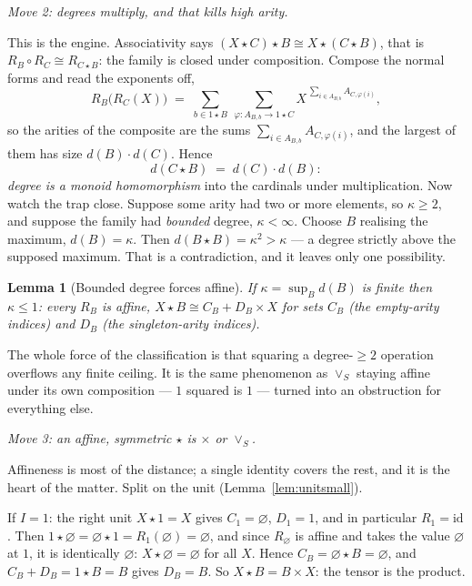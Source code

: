 \documentclass[11pt,a4paper]{book}
\newcommand{\id}{\mathrm{id}}
\theoremstyle{plain}
\newtheorem{Lemma}[Theorem]{Lemma}
\theoremstyle{definition}
\theoremstyle{remark}
\begin{document}
\medskip\noindent\emph{Move 2: degrees multiply, and that kills high arity.}

This is the engine. Associativity says $(X\star C)\star B\cong X\star(C\star B)$, that
is $R_B\circ R_C\cong R_{C\star B}$: the family is closed under composition. Compose
the normal forms and read the exponents off,
\[
   R_B\bigl(R_C(X)\bigr)
   \;=\;\sum_{b\in 1\star B}\ \sum_{\varphi:A_{B,b}\to 1\star C}
        X^{\,\sum_{i\in A_{B,b}} A_{C,\varphi(i)}},
\]
so the arities of the composite are the sums $\sum_{i\in A_{B,b}}A_{C,\varphi(i)}$,
and the largest of them has size $d(B)\cdot d(C)$. Hence
\[
   d(C\star B)\;=\;d(C)\cdot d(B):
\]
\emph{degree is a monoid homomorphism} into the cardinals under multiplication. Now
watch the trap close. Suppose some arity had two or more elements, so $\kappa\ge 2$,
and suppose the family had \emph{bounded} degree, $\kappa<\infty$. Choose $B$
realising the maximum, $d(B)=\kappa$. Then $d(B\star B)=\kappa^2>\kappa$ --- a degree
strictly above the supposed maximum. That is a contradiction, and it leaves only one
possibility.

\begin{Lemma}[Bounded degree forces affine]\label{lem:affine}
If $\kappa=\sup_B d(B)$ is finite then $\kappa\le 1$: every $R_B$ is affine,
$X\star B\cong C_B+D_B\times X$ for sets $C_B$ (the empty-arity indices) and $D_B$
(the singleton-arity indices).
\end{Lemma}

The whole force of the classification is that squaring a degree-$\ge 2$ operation
overflows any finite ceiling. It is the same phenomenon as $\vee_S$ staying affine
under its own composition --- $1$ squared is $1$ --- turned into an obstruction for
everything else.

\medskip\noindent\emph{Move 3: an affine, symmetric $\star$ is $\times$ or $\vee_S$.}

Affineness is most of the distance; a single identity covers the rest, and it is the
heart of the matter. Split on the unit (Lemma~\ref{lem:unitsmall}).

If $I=1$: the right unit $X\star 1=X$ gives $C_1=\varnothing$, $D_1=1$, and in
particular $R_1=\id$. Then $1\star\varnothing=\varnothing\star 1=R_1(\varnothing)
=\varnothing$, and since $R_\varnothing$ is affine and takes the value $\varnothing$
at $1$, it is identically $\varnothing$: $X\star\varnothing=\varnothing$ for all $X$.
Hence $C_B=\varnothing\star B=\varnothing$, and $C_B+D_B=1\star B=B$ gives $D_B=B$. So
$X\star B=B\times X$: the tensor is the product.
\end{document}
